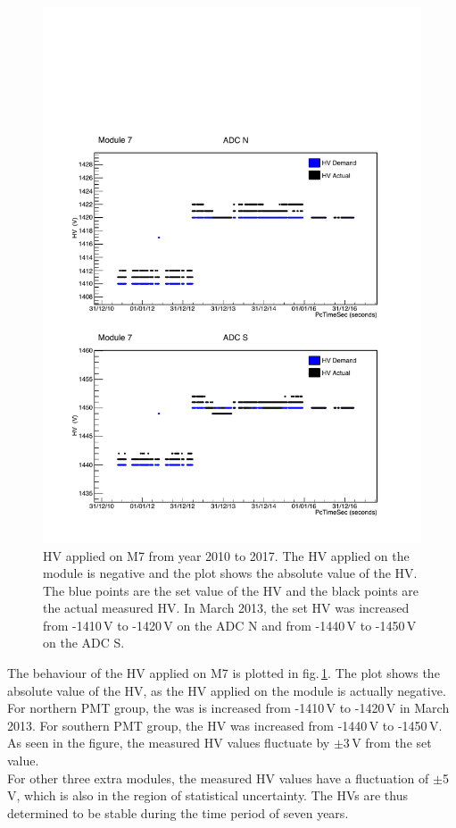 \begin{figure}[htb!]
  \centering
  \includegraphics[width=0.8\textwidth{}]{./fig/HVPlot_M7.pdf}
  \caption{HV applied on M7 from year 2010 to 2017. The HV applied on the module is negative and the plot shows the absolute value of the HV. The blue points are the set value of the HV and the black points are the actual measured HV. In March 2013, the set HV was increased from -1410\,V to -1420\,V on the ADC N and from -1440\,V to -1450\,V on the ADC S.}
  \label{fig:HV_7}
\end{figure}

The behaviour of the HV applied on M7 is plotted in fig.\,\ref{fig:HV_7}. The plot shows the absolute value of the HV, as the HV applied on the module is actually negative. For northern PMT group, the was is increased from -1410\,V to -1420\,V in March 2013. For southern PMT group, the HV was increased from -1440\,V to -1450\,V. As seen in the figure, the measured HV values fluctuate by $\pm$3\,V from the set value.\\
For other three extra modules, the measured HV values have a fluctuation of $\pm$5\,V, which is also in the region of statistical uncertainty. The HVs are thus determined to be stable during the time period of seven years.

